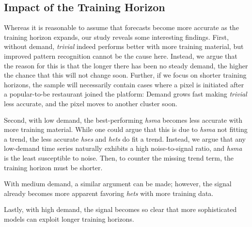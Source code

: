 \subsection{Impact of the Training Horizon}
\label{training}

Whereas it is reasonable to assume that forecasts become more accurate as the
    training horizon expands, our study reveals some interesting findings.
First, without demand, \textit{trivial} indeed performs better with more
    training material, but improved pattern recognition cannot be the cause
    here.
Instead, we argue that the reason for this is that the longer there has been
    no steady demand, the higher the chance that this will not change soon.
Further, if we focus on shorter training horizons, the sample will necessarily
    contain cases where a pixel is initiated after a popular-to-be restaurant
    joined the platform:
Demand grows fast making \textit{trivial} less accurate, and the pixel moves
    to another cluster soon.

Second, with low demand, the best-performing \textit{hsma} becomes less
    accurate with more training material.
While one could argue that this is due to \textit{hsma} not fitting a trend,
    the less accurate \textit{hses} and \textit{hets} do fit a trend.
Instead, we argue that any low-demand time series naturally exhibits a high
    noise-to-signal ratio, and \textit{hsma} is the least susceptible to
    noise.
Then, to counter the missing trend term, the training horizon must be shorter.

With medium demand, a similar argument can be made; however, the
    signal already becomes more apparent favoring \textit{hets} with more
    training data.

Lastly, with high demand, the signal becomes so clear that more sophisticated
    models can exploit longer training horizons.
